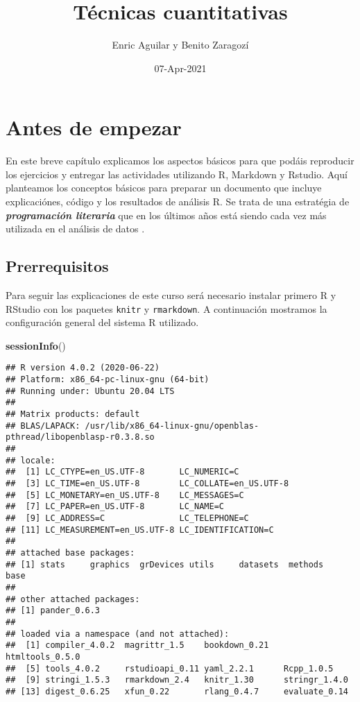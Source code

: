 \documentclass[
]{book}
\title{Técnicas cuantitativas}
\author{Enric Aguilar y Benito Zaragozí}
\date{07-Apr-2021}
\newenvironment{Shaded}{\begin{snugshade}}{\end{snugshade}}
\newcommand{\KeywordTok}[1]{\textcolor[rgb]{0.13,0.29,0.53}{\textbf{#1}}}
\newcommand{\NormalTok}[1]{#1}
\begin{document}
\maketitle

{
\setcounter{tocdepth}{1}
\tableofcontents
}
\hypertarget{antes-de-empezar}{%
\chapter*{Antes de empezar}\label{antes-de-empezar}}

En este breve capítulo explicamos los aspectos básicos para que podáis reproducir los ejercicios y entregar las actividades utilizando R, Markdown y Rstudio. Aquí planteamos los conceptos básicos para preparar un documento que incluye explicaciónes, código y los resultados de análisis R. Se trata de una estratégia de \textbf{\emph{programación literaria}} que en los últimos años está siendo cada vez más utilizada en el análisis de datos \citep{knuth1984literate, xie2015knitr}.

\hypertarget{prerrequisitos}{%
\section{Prerrequisitos}\label{prerrequisitos}}

Para seguir las explicaciones de este curso será necesario instalar primero R y RStudio con los paquetes \texttt{knitr} y \texttt{rmarkdown}. A continuación mostramos la configuración general del sistema R utilizado.

\begin{Shaded}
\begin{Highlighting}[]
\KeywordTok{sessionInfo}\NormalTok{()}
\end{Highlighting}
\end{Shaded}

\begin{verbatim}
## R version 4.0.2 (2020-06-22)
## Platform: x86_64-pc-linux-gnu (64-bit)
## Running under: Ubuntu 20.04 LTS
## 
## Matrix products: default
## BLAS/LAPACK: /usr/lib/x86_64-linux-gnu/openblas-pthread/libopenblasp-r0.3.8.so
## 
## locale:
##  [1] LC_CTYPE=en_US.UTF-8       LC_NUMERIC=C              
##  [3] LC_TIME=en_US.UTF-8        LC_COLLATE=en_US.UTF-8    
##  [5] LC_MONETARY=en_US.UTF-8    LC_MESSAGES=C             
##  [7] LC_PAPER=en_US.UTF-8       LC_NAME=C                 
##  [9] LC_ADDRESS=C               LC_TELEPHONE=C            
## [11] LC_MEASUREMENT=en_US.UTF-8 LC_IDENTIFICATION=C       
## 
## attached base packages:
## [1] stats     graphics  grDevices utils     datasets  methods   base     
## 
## other attached packages:
## [1] pander_0.6.3
## 
## loaded via a namespace (and not attached):
##  [1] compiler_4.0.2  magrittr_1.5    bookdown_0.21   htmltools_0.5.0
##  [5] tools_4.0.2     rstudioapi_0.11 yaml_2.2.1      Rcpp_1.0.5     
##  [9] stringi_1.5.3   rmarkdown_2.4   knitr_1.30      stringr_1.4.0  
## [13] digest_0.6.25   xfun_0.22       rlang_0.4.7     evaluate_0.14
\end{verbatim}
\end{document}
